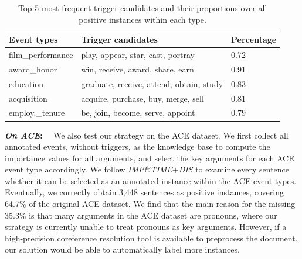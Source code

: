\begin{table}
	\scriptsize
	\centering
	\begin{tabular}{lll}
    \toprule
		\textbf{Event types} & \textbf{Trigger candidates} & \textbf{Percentage} \\
    \midrule
		\rowcolor{Gray}film\_performance & play, appear, star, cast, portray & 0.72 \\
		award\_honor & win, receive, award, share, earn & 0.91 \\
		\rowcolor{Gray}education & graduate, receive, attend, obtain, study & 0.83 \\
		acquisition & acquire, purchase, buy, merge, sell & 0.81 \\
		\rowcolor{Gray}employ.\_tenure & be, join, become, serve, appoint & 0.79 \\
    \bottomrule
	\end{tabular}
    \vspace{-2mm}
	\caption{Top 5 most frequent trigger candidates and their proportions over all positive instances within each type.}
    \vspace{-3mm}
	\label{freqTriggers}
\end{table}

\vspace{2mm} \noindent\textbf{\emph{On ACE}: \mbox{ }} We also test our strategy on the ACE dataset. We first collect all annotated events,
without triggers, as the knowledge base to compute the importance values for all arguments, and select the key arguments for each ACE event
type accordingly. We follow \emph{IMP\&TIME}+\emph{DIS} to examine every sentence whether it can be selected as an annotated instance
within the ACE event types. Eventually, we correctly obtain 3,448 sentences as positive instances, covering 64.7\% of the original ACE
dataset.  We find that the main reason for the missing 35.3\% is that many arguments in the ACE dataset are pronouns, where our strategy is
currently unable to treat pronouns as key arguments. However, if a high-precision coreference resolution tool is available to preprocess
the document,
our solution would be able to automatically label more instances.%

